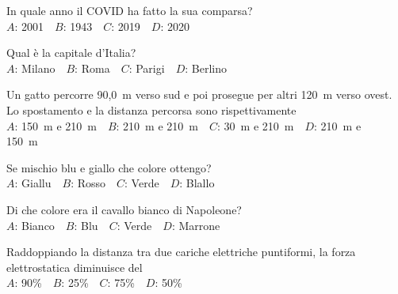 \mcquestionfooter



\def\mcquestionnumber{12}


\mcquestionheader In quale anno il COVID ha fatto la sua comparsa?\\
{$A$}: 2001\ \ {$B$}: 1943\ \ {$C$}: 2019\ \ {$D$}: 2020\ \ 

\mcquestionfooter



\mcpaperfooter

\def\mcserialnumber{35}
\mcpaperheader


\def\mcquestionnumber{1}


\mcquestionheader Qual è la capitale d’Italia?\\
{$A$}: Milano\ \ {$B$}: Roma\ \ {$C$}: Parigi\ \ {$D$}: Berlino\ \ 

\mcquestionfooter



\def\mcquestionnumber{2}


\mcquestionheader Un gatto percorre 90,0~m verso sud e poi prosegue per altri 120~m verso ovest. Lo spostamento e la distanza percorsa sono rispettivamente\\
{$A$}: 150~m e 210~m\ \ {$B$}: 210~m e 210~m\ \ {$C$}: 30~m e 210~m\ \ {$D$}: 210~m e 150~m\ \ 

\mcquestionfooter



\def\mcquestionnumber{3}


\mcquestionheader Se mischio blu e giallo che colore ottengo?\\
{$A$}: Giallu\ \ {$B$}: Rosso\ \ {$C$}: Verde\ \ {$D$}: Blallo\ \ 

\mcquestionfooter



\def\mcquestionnumber{4}


\mcquestionheader Di che colore era il cavallo bianco di Napoleone?\\
{$A$}: Bianco\ \ {$B$}: Blu\ \ {$C$}: Verde\ \ {$D$}: Marrone\ \ 

\mcquestionfooter



\def\mcquestionnumber{5}


\mcquestionheader Raddoppiando la distanza tra due cariche elettriche puntiformi, la forza elettrostatica diminuisce del\\
{$A$}: 90\%\ \ {$B$}: 25\%\ \ {$C$}: 75\%\ \ {$D$}: 50\%\ \ 

\mcquestionfooter



